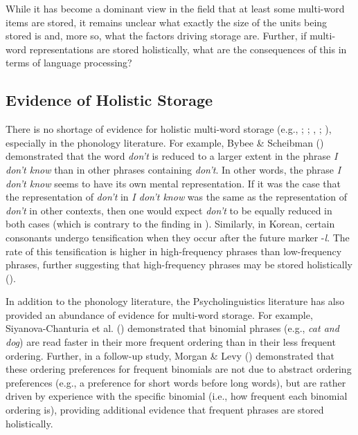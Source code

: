 \documentclass[
  12pt,
  letterpaper,
]{scrreprt}
\begin{document}
While it has become a dominant view in the field that at least some
multi-word items are stored, it remains unclear what exactly the size of
the units being stored is and, more so, what the factors driving storage
are. Further, if multi-word representations are stored holistically,
what are the consequences of this in terms of language processing?

\subsection{Evidence of Holistic
Storage}\label{evidence-of-holistic-storage}

There is no shortage of evidence for holistic multi-word storage (e.g.,
;
; ,
;
), especially in the phonology literature. For example, Bybee \&
Scheibman ()
demonstrated that the word \emph{don't} is reduced to a larger extent in
the phrase \emph{I don't know} than in other phrases containing
\emph{don't}. In other words, the phrase \emph{I don't know} seems to
have its own mental representation. If it was the case that the
representation of \emph{don't} in \emph{I don't know} was the same as
the representation of \emph{don't} in other contexts, then one would
expect \emph{don't} to be equally reduced in both cases (which is
contrary to the finding in
).
Similarly, in Korean, certain consonants undergo tensification when they
occur after the future marker -\emph{l}. The rate of this tensification
is higher in high-frequency phrases than low-frequency phrases, further
suggesting that high-frequency phrases may be stored holistically
().

In addition to the phonology literature, the Psycholinguistics
literature has also provided an abundance of evidence for multi-word
storage. For example, Siyanova-Chanturia et al.
()
demonstrated that binomial phrases (e.g., \emph{cat and dog}) are read
faster in their more frequent ordering than in their less frequent
ordering. Further, in a follow-up study, Morgan \& Levy
() demonstrated
that these ordering preferences for frequent binomials are not due to
abstract ordering preferences (e.g., a preference for short words before
long words), but are rather driven by experience with the specific
binomial (i.e., how frequent each binomial ordering is), providing
additional evidence that frequent phrases are stored holistically.
\end{document}
